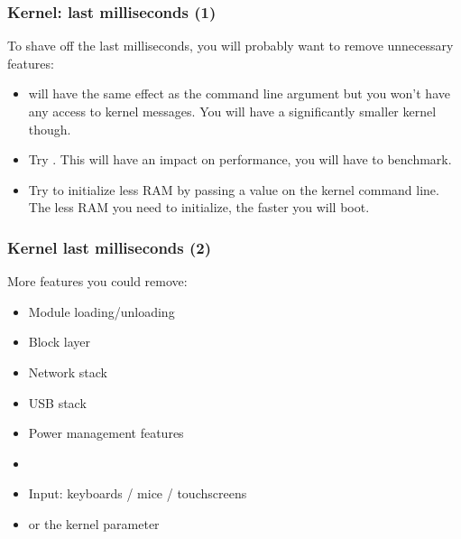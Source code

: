\begin{frame}
\frametitle{Kernel: last milliseconds (1)}
To shave off the last milliseconds, you will probably want to remove
unnecessary features:
\begin{itemize}
        \item {} will have the same effect as the
               command line argument but you won't have
	      any access to kernel messages. You will have a
              significantly smaller kernel though.
        \item Try . This will have
              an impact on performance, you will have to benchmark.
        \item Try to initialize less RAM by passing a  value
              on the kernel command line. The less RAM you need to
              initialize, the faster you will boot.
\end{itemize}
\end{frame}

\begin{frame}
\frametitle{Kernel last milliseconds (2)}
More features you could remove:
\begin{itemize}
        \item Module loading/unloading
        \item Block layer
        \item Network stack
        \item USB stack
        \item Power management features
        \item {}
        \item Input: keyboards / mice / touchscreens
        \item {} or the
               kernel parameter
\end{itemize}
\end{frame}

